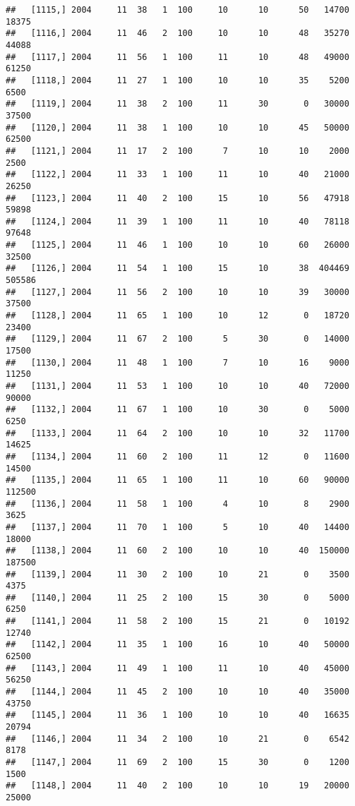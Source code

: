 \documentclass{article}\usepackage[]{graphicx}\usepackage[]{color}
\makeatletter
\newenvironment{kframe}{%
 \def\at@end@of@kframe{}%
 \ifinner\ifhmode%
  \def\at@end@of@kframe{\end{minipage}}%
  \begin{minipage}{\columnwidth}%
 \fi\fi%
 \def\FrameCommand##1{\hskip\@totalleftmargin \hskip-\fboxsep
 \colorbox{shadecolor}{##1}\hskip-\fboxsep
     \hskip-\linewidth \hskip-\@totalleftmargin \hskip\columnwidth}%
 \MakeFramed {\advance\hsize-\width
   \@totalleftmargin\z@ \linewidth\hsize
   \@setminipage}}%
 {\par\unskip\endMakeFramed%
 \at@end@of@kframe}
\newenvironment{knitrout}{}{} %
\makeatother
\begin{document}
\begin{knitrout}
\begin{kframe}
\begin{verbatim}
##   [1115,] 2004     11  38   1  100     10      10      50   14700   18375
##   [1116,] 2004     11  46   2  100     10      10      48   35270   44088
##   [1117,] 2004     11  56   1  100     11      10      48   49000   61250
##   [1118,] 2004     11  27   1  100     10      10      35    5200    6500
##   [1119,] 2004     11  38   2  100     11      30       0   30000   37500
##   [1120,] 2004     11  38   1  100     10      10      45   50000   62500
##   [1121,] 2004     11  17   2  100      7      10      10    2000    2500
##   [1122,] 2004     11  33   1  100     11      10      40   21000   26250
##   [1123,] 2004     11  40   2  100     15      10      56   47918   59898
##   [1124,] 2004     11  39   1  100     11      10      40   78118   97648
##   [1125,] 2004     11  46   1  100     10      10      60   26000   32500
##   [1126,] 2004     11  54   1  100     15      10      38  404469  505586
##   [1127,] 2004     11  56   2  100     10      10      39   30000   37500
##   [1128,] 2004     11  65   1  100     10      12       0   18720   23400
##   [1129,] 2004     11  67   2  100      5      30       0   14000   17500
##   [1130,] 2004     11  48   1  100      7      10      16    9000   11250
##   [1131,] 2004     11  53   1  100     10      10      40   72000   90000
##   [1132,] 2004     11  67   1  100     10      30       0    5000    6250
##   [1133,] 2004     11  64   2  100     10      10      32   11700   14625
##   [1134,] 2004     11  60   2  100     11      12       0   11600   14500
##   [1135,] 2004     11  65   1  100     11      10      60   90000  112500
##   [1136,] 2004     11  58   1  100      4      10       8    2900    3625
##   [1137,] 2004     11  70   1  100      5      10      40   14400   18000
##   [1138,] 2004     11  60   2  100     10      10      40  150000  187500
##   [1139,] 2004     11  30   2  100     10      21       0    3500    4375
##   [1140,] 2004     11  25   2  100     15      30       0    5000    6250
##   [1141,] 2004     11  58   2  100     15      21       0   10192   12740
##   [1142,] 2004     11  35   1  100     16      10      40   50000   62500
##   [1143,] 2004     11  49   1  100     11      10      40   45000   56250
##   [1144,] 2004     11  45   2  100     10      10      40   35000   43750
##   [1145,] 2004     11  36   1  100     10      10      40   16635   20794
##   [1146,] 2004     11  34   2  100     10      21       0    6542    8178
##   [1147,] 2004     11  69   2  100     15      30       0    1200    1500
##   [1148,] 2004     11  40   2  100     10      10      19   20000   25000

\end{verbatim}
\end{kframe}
\end{knitrout}
\end{document}
